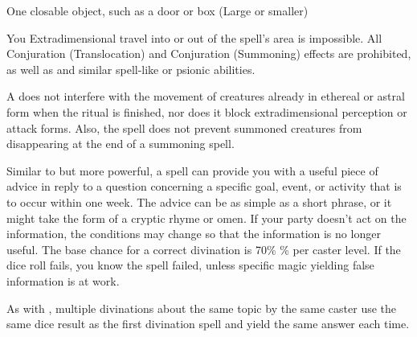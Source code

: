 \begin{spelltarget}{One closable object, such as a door or box (Large or smaller)}
\begin{spelltarget}{You}
\spelleffect Extradimensional travel into or out of the spell's area is impossible. All Conjuration (Translocation) and Conjuration (Summoning) effects are prohibited, as well as  and similar spell-like or psionic abilities.
\spellnotes \par A  does not interfere with the movement of creatures already in ethereal or astral form when the ritual is finished, nor does it block extradimensional perception or attack forms. Also, the spell does not prevent summoned creatures from disappearing at the end of a summoning spell.

\spelleffect Similar to  but more powerful, a  spell can provide you with a useful piece of advice in reply to a question concerning a specific goal, event, or activity that is to occur within one week. The advice can be as simple as a short phrase, or it might take the form of a cryptic rhyme or omen. If your party doesn't act on the information, the conditions may change so that the information is no longer useful. The base chance for a correct divination is 70\% \% per caster level. If the dice roll fails, you know the spell failed, unless specific magic yielding false information is at work.
\spellnotes \par As with , multiple divinations about the same topic by the same caster use the same dice result as the first divination spell and yield the same answer each time.


\end{spelltarget}
\end{spelltarget}
